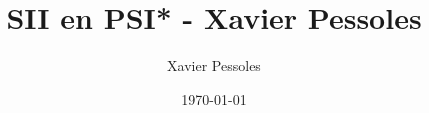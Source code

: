 \documentclass[
	fontsize=10pt, %
	twoside=true, %
]{kaobook}
\newcommand{\repRel}{../../..}
\newcommand{\repStyle}{\repRel/Style}
\begin{document}

\titlehead{Document Template}
\title[SII en PSI* - Xavier Pessoles]{SII en PSI* - Xavier Pessoles}
\author[XP]{Xavier Pessoles}
\date{\today}

%
\frontmatter %


%
\mainmatter %


\setcounter{margintocdepth}{\sectiontocdepth}
\marginlayout
\graphicspath{{\repStyle/png}}

\pagestyle{xp.scrheadings}



\newcommand{\repExo}{}
\newcommand{\nomExo}{}

\livrettrue %
\collefalse\colletrue
\normaltrue

\newcommand{\exer}{\subsection*}

\renewcommand{\repExo}{\repRel/PSI_Cy_01_ModelisationSystemes/Ch_00_IS/}
\renewcommand{\nomExo}{Colle_01_PorteTGV}
\graphicspath{{\repRel/Style/png/}{\repExo/\nomExo/images/}}

\newpage
\clearpage

\renewcommand{\repExo}{\repRel/PSI_Cy_01_ModelisationSystemes/Ch_00_IS/}
\renewcommand{\nomExo}{Colle_02_Prothese}
\graphicspath{{\repRel/Style/png/}{\repExo/\nomExo/images/}}

\newpage
\clearpage

\renewcommand{\repExo}{\repRel/PSI_Cy_01_ModelisationSystemes/Ch_00_IS/}
\renewcommand{\nomExo}{Colle_03_Moissonneuse}
\graphicspath{{\repRel/Style/png/}{\repExo/\nomExo/images/}}

\newpage
\clearpage
\end{document}
